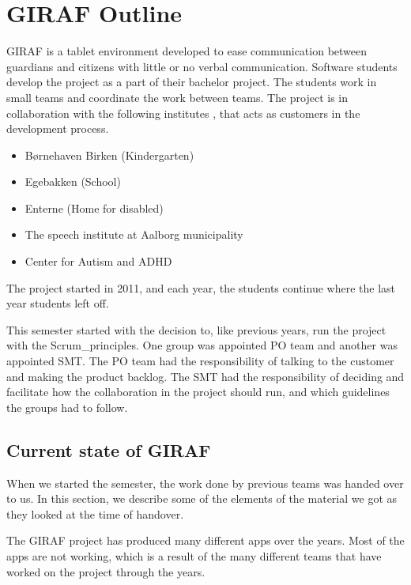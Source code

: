 \chapter{GIRAF Outline}

GIRAF is a tablet environment developed to ease communication between \glspl{guardian} and \glspl{citizen} with little or no verbal communication. Software students develop the project as a part of their bachelor project. The students work in small teams and coordinate the work between teams. The project is in collaboration with the following institutes \cite{GirafWebsite}, that acts as customers in the development process.

\begin{itemize}
    \item Børnehaven Birken (Kindergarten) \cite{bhBirken}
    \item Egebakken (School) \cite{egebakken}
    \item Enterne (Home for disabled) \cite{enterne}
    \item The speech institute at Aalborg municipality
    \item Center for Autism and ADHD \cite{center_for_autism}
\end{itemize}

The project started in 2011, and each year, the students continue where the last year students left off.

This semester started with the decision to, like previous years, run the project with the \gls{Scrum_principles}. One group was appointed \gls{PO} team and another was appointed \gls{SMT}. The \gls{PO} team had the responsibility of talking to the customer and making the product backlog. The \gls{SMT} had the responsibility of deciding and facilitate how the collaboration in the project should run, and which guidelines the groups had to follow.

\section{Current state of GIRAF}

When we started the semester, the work done by previous teams was handed over to us. In this section, we describe some of the elements of the material we got as they looked at the time of handover.

The GIRAF project has produced many different apps over the years. Most of the apps are not working, which is a result of the many different teams that have worked on the project through the years.

